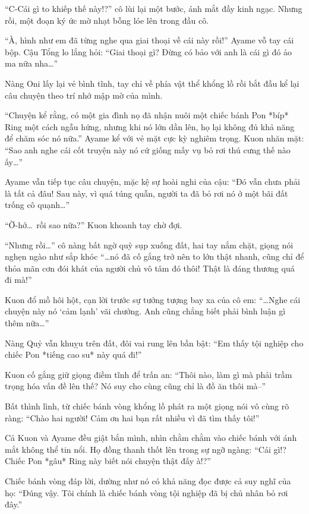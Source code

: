 \documentclass[../main.tex]{subfiles}
\begin{document}
``C-Cái gì to khiếp thế này!?'' cô lùi lại một bước, ánh mắt đầy kinh ngạc. Nhưng rồi, một đoạn ký ức mờ nhạt bỗng lóe lên trong đầu cô.

``À, hình như em đã từng nghe qua giai thoại về cái này rồi!'' Ayame vỗ tay cái bộp.
Cậu Tổng lo lắng hỏi: ``Giai thoại gì? Đừng có bảo với anh là cái gì đó ảo ma nữa nha\dots''

Nàng Oni lấy lại vẻ bình tĩnh, tay chỉ về phía vật thể khổng lồ rồi bắt đầu kể lại câu chuyện theo trí nhớ mập mờ của mình.

``Chuyện kể rằng, có một gia đình nọ đã nhận nuôi một chiếc bánh Pon *bíp* Ring một cách ngẫu hứng, nhưng khi nó lớn dần lên, họ lại không đủ khả năng để chăm sóc nó nữa.'' Ayame kể với vẻ mặt cực kỳ nghiêm trọng.
Kuon nhăn mặt: ``Sao anh nghe cái cốt truyện này nó cứ giống mấy vụ bỏ rơi thú cưng thế nào ấy\dots''

Ayame vẫn tiếp tục câu chuyện, mặc kệ sự hoài nghi của cậu: ``Đó vẫn chưa phải là tất cả đâu! Sau này, vì quá túng quẫn, người ta đã bỏ rơi nó ở một bãi đất trống cô quạnh\dots''

``Ờ-hớ\dots\ rồi sao nữa?'' Kuon khoanh tay chờ đợi.

``Nhưng rồi\dots'' cô nàng bất ngờ quỳ sụp xuống đất, hai tay nắm chặt, giọng nói nghẹn ngào như sắp khóc ``\dots nó đã cố gắng trở nên to lớn thật nhanh, cũng chỉ để thỏa mãn cơn đói khát của người chủ vô tâm đó thôi! Thật là đáng thương quá đi mà!''

Kuon đổ mồ hôi hột, cạn lời trước sự tưởng tượng bay xa của cô em: ``\dots Nghe cái chuyện này nó `cảm lạnh' vãi chưởng. Anh cũng chẳng biết phải bình luận gì thêm nữa\dots''

Nàng Quỷ vẫn khuỵu trên đất, đôi vai rung lên bần bật: ``Em thấy tội nghiệp cho chiếc Pon *tiếng cao su* này quá đi!''

Kuon cố gắng giữ giọng điềm tĩnh để trấn an: ``Thôi nào, làm gì mà phải trầm trọng hóa vấn đề lên thế? Nó suy cho cùng cũng chỉ là đồ ăn thôi mà--''


Bất thình lình, từ chiếc bánh vòng khổng lồ phát ra một giọng nói vô cùng rõ ràng: ``Chào hai người! Cảm ơn hai bạn rất nhiều vì đã tìm thấy tôi!''

Cả Kuon và Ayame đều giật bắn mình, nhìn chằm chằm vào chiếc bánh với ánh mắt không thể tin nổi. Họ đồng thanh thốt lên trong sự ngỡ ngàng: ``Cái gì!? Chiếc Pon *gâu* Ring này biết nói chuyện thật đấy à!?''

Chiếc bánh vòng đáp lời, dường như nó có khả năng đọc được cả suy nghĩ của họ: ``Đúng vậy. Tôi chính là chiếc bánh vòng tội nghiệp đã bị chủ nhân bỏ rơi đây.''
\end{document}
